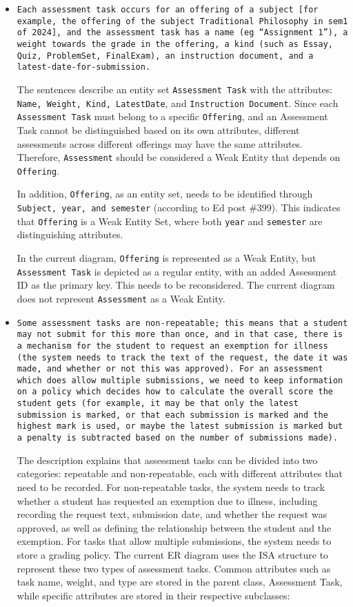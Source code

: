 \documentclass[a4paper,12pt]{article}
\begin{document}
\begin{itemize}
  \item \texttt{Each assessment task occurs for an offering of a subject [for example, the offering of the subject Traditional Philosophy in sem1 of 2024], and the assessment task has a name (eg “Assignment 1”), a weight towards the grade in the offering, a kind (such as Essay, Quiz, ProblemSet, FinalExam), an instruction document, and a latest-date-for-submission.}

  The sentences describe an entity set \texttt{Assessment Task} with the attributes: \texttt{Name, Weight, Kind, LatestDate}, and \texttt{Instruction Document}. Since each \texttt{Assessment Task} must belong to a specific \texttt{Offering}, and an Assessment Task cannot be distinguished based on its own attributes, different assessments across different offerings may have the same attributes. Therefore, \texttt{Assessment} should be considered a Weak Entity that depends on \texttt{Offering}.

  In addition, \texttt{Offering}, as an entity set, needs to be identified through \texttt{Subject, year, and semester} (according to Ed post \#399). This indicates that \texttt{Offering} is a Weak Entity Set, where both \texttt{year} and \texttt{semester} are distinguishing attributes.

  In the current diagram, \texttt{Offering} is represented as a Weak Entity, but \texttt{Assessment Task} is depicted as a regular entity, with an added Assessment ID as the primary key. This needs to be reconsidered. The current diagram does not represent \texttt{Assessment} as a Weak Entity.

  \item \texttt{Some assessment tasks are non-repeatable; this means that a student may not submit for this more than once, and in that case, there is a mechanism for the student to request an exemption for illness (the system needs to track the text of the request, the date it was made, and whether or not this was approved). For an assessment which does allow multiple submissions, we need to keep information on a policy which decides how to calculate the overall score the student gets (for example, it may be that only the latest submission is marked, or that each submission is marked and the highest mark is used, or maybe the latest submission is marked but a penalty is subtracted based on the number of submissions made). }

  The description explains that assessment tasks can be divided into two categories: repeatable and non-repeatable, each with different attributes that need to be recorded. For non-repeatable tasks, the system needs to track whether a student has requested an exemption due to illness, including recording the request text, submission date, and whether the request was approved, as well as defining the relationship between the student and the exemption. For tasks that allow multiple submissions, the system needs to store a grading policy. The current ER diagram uses the ISA structure to represent these two types of assessment tasks. Common attributes such as task name, weight, and type are stored in the parent class, Assessment Task, while specific attributes are stored in their respective subclasses:


\end{itemize}
\end{document}
